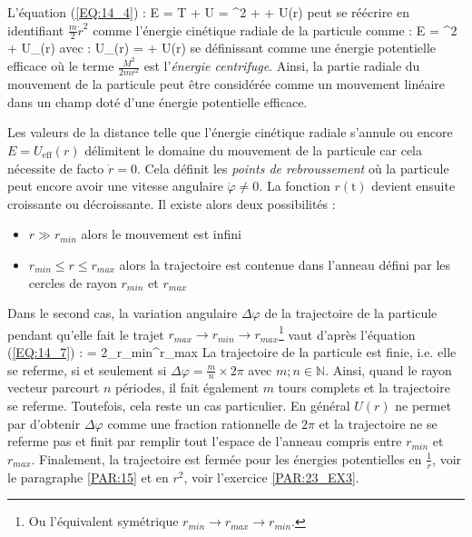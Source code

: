 L'\'equation (\ref{EQ:14_4}) :
\benn
	E = T + U = ^{2} +  + U(r)
\eenn
peut se r\'e\'ecrire en identifiant $\frac{m}{2}\dot{r}^{2}$ comme l'\'energie cin\'etique radiale de la particule comme :
\benn
	E = ^{2} + U_{}(r)
\eenn
avec :
\be
	U_{}(r) =  + U(r) \label{EQ:14_8}
\ee
se d\'efinissant comme une \'energie potentielle efficace o\`u le terme $\frac{M^{2}}{2mr^{2}}$ est l'\emph{\'energie centrifuge}. Ainsi, la partie radiale du mouvement de la particule peut \^etre consid\'er\'ee comme un mouvement lin\'eaire dans un champ dot\'e d'une \'energie potentielle efficace.

Les valeurs de la distance telle que l'\'energie cin\'etique radiale s'annule ou encore $E = U_{\mathrm{eff}}(r)$ d\'elimitent le domaine du mouvement de la particule car cela n\'ecessite de facto $\dot{r} = 0$. Cela d\'efinit les \emph{points de rebroussement} o\`u la particule peut encore avoir une vitesse angulaire $\dot{\varphi}\neq 0$. La fonction $r(\mathrm{t})$ devient ensuite croissante ou d\'ecroissante. Il existe alors deux possibilit\'es :
\begin{itemize}
	\item $r \gg r_{min}$ alors le mouvement est infini
	\item $r_{min} \leqslant r \leqslant r_{max}$ alors la trajectoire est contenue dans l'anneau d\'efini par les cercles de rayon $r_{min}$ et $r_{max}$
\end{itemize}
Dans le second cas, la variation angulaire $\Delta\varphi$ de la trajectoire de la particule pendant qu'elle fait le trajet $r_{max} \rightarrow r_{min} \rightarrow r_{max}$\footnote{Ou l'\'equivalent sym\'etrique $r_{min} \rightarrow r_{max} \rightarrow r_{min}$.} vaut d'apr\`es l'\'equation (\ref{EQ:14_7}) :
\be
	\Delta\varphi = 2\bigintsss_{r_{min}}^{r_{max}}{} \label{EQ:14_10}
\ee
La trajectoire de la particule est finie, i.e. elle se referme, si et seulement si $\Delta\varphi = \frac{m}{n}\times 2\pi$ avec ${m;n}\in\mathbb{N}$. Ainsi, quand le rayon vecteur parcourt $n$ p\'eriodes, il fait \'egalement $m$ tours complets et la trajectoire se referme. Toutefois, cela reste un cas particulier. En g\'en\'eral $U(r)$ ne permet par d'obtenir $\Delta\varphi$ comme une fraction rationnelle de $2\pi$ et la trajectoire ne se referme pas et finit par remplir tout l'espace de l'anneau compris entre $r_{min}$ et $r_{max}$. Finalement, la trajectoire est ferm\'ee pour les \'energies potentielles en $\frac{1}{r}$, voir le paragraphe \ref{PAR:15} et en $r^{2}$, voir l'exercice \ref{PAR:23_EX3}.

